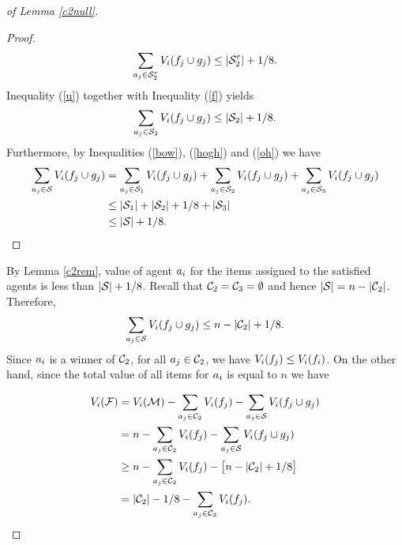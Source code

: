 \begin{proof}[of Lemma \ref{c2null}]
\begin{proof}
\begin{equation}
\label{u}
\sum_{a_j \in \mathcal{S}_2^r} V_i(f_j \cup g_j) \leq |\mathcal{S}_2^r| + 1/8.
\end{equation}
Inequality (\ref{u}) together with Inequality (\ref{f}) yields
\begin{equation}
\label{oh}
\sum_{a_j \in \mathcal{S}_2} V_i(f_j \cup g_j) \leq |\mathcal{S}_2| + 1/8.
\end{equation}
Furthermore, by Inequalities (\ref{bow}), (\ref{hogh}) and (\ref{oh}) we have
\begin{equation}
\begin{split}
\sum_{a_j \in \mathcal{S}} V_i( f_j \cup g_j)  & = \sum_{a_j \in \mathcal{S}_1} V_i( f_j \cup g_j) + \sum_{a_j \in \mathcal{S}_2} V_i( f_j \cup g_j) + \sum_{a_j \in \mathcal{S}_3} V_i( f_j \cup g_j)\\
& \leq |\mathcal{S}_1| + |\mathcal{S}_2|+ 1/8 + |\mathcal{S}_3| \\
& \leq |\mathcal{S}|+1/8. \\
\end{split}
\end{equation}
 
\end{proof}


By Lemma \ref{c2rem}, value of agent $a_i$ for the items assigned to the satisfied agents is less than $|\mathcal{S}| + 1/8$. Recall that $\mathcal{C}_2 = \mathcal{C}_3 = \emptyset$ and hence $|\mathcal{S}| = n - |\mathcal{C}_2|$. Therefore,
\begin{equation}
\sum_{a_j \in \mathcal{S}} V_i( f_j \cup g_j) \leq n - |\mathcal{C}_2| + 1/8.
\end{equation}
Since $a_i$ is a winner of $\mathcal{C}_2$, for all $a_j \in \mathcal{C}_2$, we have  $V_i(f_j)\leq V_i(f_i)$. On the other hand, since the total value of all items for $a_i$ is equal to $n$ we have

\begin{equation}\label{yy1}
\begin{split}
V_i({\mathcal{F}}) & = V_i(\mathcal{M}) - \sum_{a_j \in \mathcal{C}_2} {V_i(f_j)} - \sum_{a_j \in \mathcal{S}}V_i(f_j \cup g_j)\\
& = n - \sum_{a_j \in \mathcal{C}_2} {V_i(f_j)} - \sum_{a_j \in \mathcal{S}}V_i(f_j \cup g_j)\\
& \geq n - \sum_{a_j \in \mathcal{C}_2} {V_i(f_j)} - \big[ n - |\mathcal{C}_2| + 1/8 \big] \\
& = |\mathcal{C}_2| - 1/8 - \sum_{a_j \in \mathcal{C}_2} {V_i(f_j)}.
\end{split}
\end{equation}


\end{proof}
